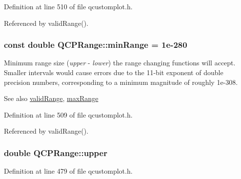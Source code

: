 Definition at line 510 of file qcustomplot.\+h.



Referenced by valid\+Range().

\hypertarget{class_q_c_p_range_ab46d3bc95030ee25efda41b89e2b616b}{}
\subsubsection[{min\+Range}]{\setlength{\rightskip}{0pt plus 5cm}const double Q\+C\+P\+Range\+::min\+Range = 1e-\/280\hspace{0.3cm}{\ttfamily [static]}}\label{class_q_c_p_range_ab46d3bc95030ee25efda41b89e2b616b}
Minimum range size ({\itshape upper} -\/ {\itshape lower}) the range changing functions will accept. Smaller intervals would cause errors due to the 11-\/bit exponent of double precision numbers, corresponding to a minimum magnitude of roughly 1e-\/308. \begin{DoxySeeAlso}{See also}
\hyperlink{class_q_c_p_range_ab38bd4841c77c7bb86c9eea0f142dcc0}{valid\+Range}, \hyperlink{class_q_c_p_range_a5ca51e7a2dc5dc0d49527ab171fe1f4f}{max\+Range} 
\end{DoxySeeAlso}


Definition at line 509 of file qcustomplot.\+h.



Referenced by valid\+Range().

\hypertarget{class_q_c_p_range_ae44eb3aafe1d0e2ed34b499b6d2e074f}{}
\subsubsection[{upper}]{\setlength{\rightskip}{0pt plus 5cm}double Q\+C\+P\+Range\+::upper}\label{class_q_c_p_range_ae44eb3aafe1d0e2ed34b499b6d2e074f}


Definition at line 479 of file qcustomplot.\+h.



